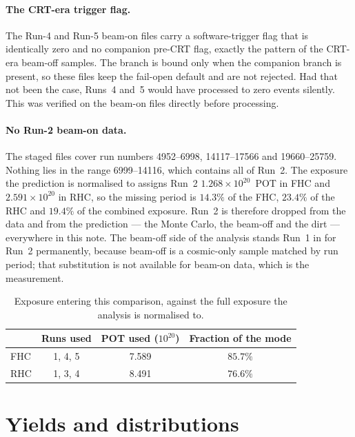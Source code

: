 \documentclass[11pt,a4paper]{article}
\begin{document}
\paragraph{The CRT-era trigger flag.} The Run-4 and Run-5 beam-on files carry a
software-trigger flag that is identically zero and no companion pre-CRT flag, exactly the
pattern of the CRT-era beam-off samples. The branch is bound only when the companion
branch is present, so these files keep the fail-open default and are not rejected. Had
that not been the case, Runs~4 and~5 would have processed to zero events silently. This
was verified on the beam-on files directly before processing.

\paragraph{No Run-2 beam-on data.}
The staged files cover run numbers 4952--6998, 14117--17566 and 19660--25759. Nothing
lies in the range 6999--14116, which contains all of Run~2. The exposure the prediction is
normalised to assigns Run~2 $1.268\times10^{20}$~POT in FHC and $2.591\times10^{20}$ in
RHC, so the missing period is $14.3\%$ of the FHC, $23.4\%$ of the RHC and $19.4\%$ of the
combined exposure. Run~2 is therefore dropped from the data and from the prediction ---
the Monte Carlo, the beam-off and the dirt --- everywhere in this note. The beam-off side
of the analysis stands Run~1 in for Run~2 permanently, because beam-off is a
cosmic-only sample matched by run period; that substitution is not available for beam-on
data, which is the measurement.

\begin{table}[H]
  \centering
  \caption{Exposure entering this comparison, against the full exposure the analysis is
    normalised to.}
  \label{tab:exposure}
  \small
  \begin{tabular}{lccc}
    \toprule
    & Runs used & POT used ($10^{20}$) & Fraction of the mode \\
    \midrule
    FHC & 1, 4, 5 & 7.589 & $85.7\%$ \\
    RHC & 1, 3, 4 & 8.491 & $76.6\%$ \\
    \bottomrule
  \end{tabular}
\end{table}

\section{Yields and distributions}
\label{sec:yields}
\end{document}
